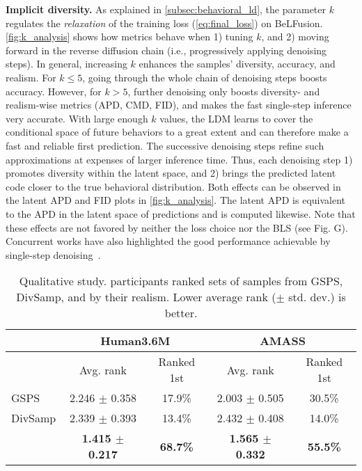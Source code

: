 \documentclass[10pt,twocolumn,letterpaper]{article}
\begin{document}
\textbf{Implicit diversity.} As explained in \autoref{subsec:behavioral_ld}, the parameter $k$ regulates the \textit{relaxation} of the training loss (\autoref{eq:final_loss}) on BeLFusion. \autoref{fig:k_analysis} shows how metrics behave when 1) tuning $k$, and 2) moving forward in the reverse diffusion chain (i.e., progressively applying denoising steps). In general, increasing $k$ enhances the samples' diversity, accuracy, and realism. For $k {\leq} 5$, going through the whole chain of denoising steps boosts accuracy. However, for $k {>} 5$, further denoising only boosts diversity- and realism-wise metrics (APD, CMD, FID), and makes the fast single-step inference very accurate. With large enough $k$ values, the LDM learns to cover the conditional space of future behaviors to a great extent and can therefore make a fast and reliable first prediction. The successive denoising steps refine such approximations at expenses of larger inference time. Thus, each denoising step 1) promotes diversity within the latent space, and 2) brings the predicted latent code closer to the true behavioral distribution. Both effects can be observed in the latent APD and FID plots in \autoref{fig:k_analysis}. The latent APD is equivalent to the APD in the latent space of predictions and is computed likewise. 
Note that these effects are not favored by neither the loss choice nor the BLS (see \supp{} Fig. G). Concurrent works have also highlighted the good performance achievable by single-step denoising~\cite{bansal2022colddiff, chen2022diffusiondet}.



\setlength{\tabcolsep}{3pt}
\begin{table}[t!]\renewcommand{\arraystretch}{0.9}
    \footnotesize
    \centering
    \begin{tabular}{l@{\hskip 4mm}cccc}
        \toprule
        & \multicolumn{2}{c}{Human3.6M\cite{ionescu2013h36m}} & \multicolumn{2}{c}{AMASS\cite{mahmood2019amass}} \\
        \midrule
        & Avg. rank & Ranked 1st & Avg. rank & Ranked 1st \\
        \midrule
        GSPS & 2.246 $\pm$ 0.358 & 17.9\% & 2.003 $\pm$ 0.505 & 30.5\% \\
        DivSamp & 2.339 $\pm$ 0.393 & 13.4\% & 2.432 $\pm$ 0.408 & 14.0\% \\
        \modelname{} & \textbf{1.415 $\pm$ 0.217} & \textbf{68.7\%} & \textbf{1.565 $\pm$ 0.332} & \textbf{55.5\%} \\
        \bottomrule
    \end{tabular}
    \vspace{-0.1cm}
    \caption{Qualitative study. \participants{} participants ranked sets of samples from GSPS, DivSamp, and \modelname{} by their realism. Lower average rank ($\pm$ std. dev.) is better.}
    \label{tab:mos_results}\vspace{-0.5cm}
\end{table}
\setlength{\tabcolsep}{6pt}
\end{document}
